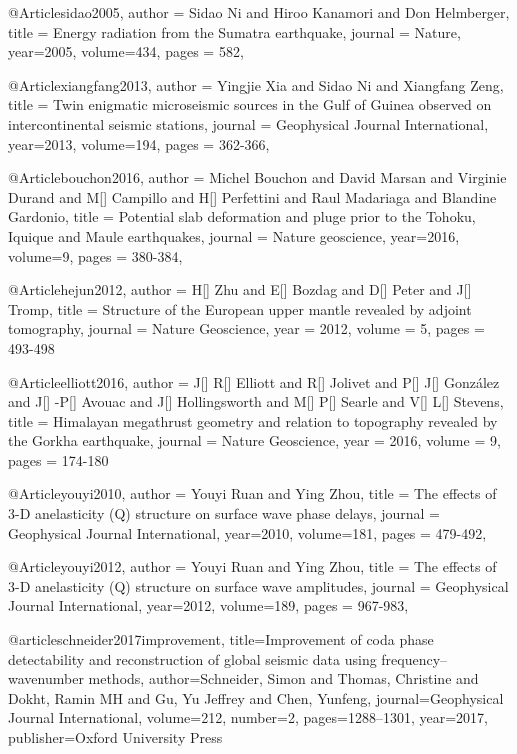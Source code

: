 @Article{sidao2005,
  author =	 {Sidao Ni and Hiroo Kanamori and Don Helmberger},
  title =	 {Energy radiation from the Sumatra earthquake},
  journal =	 {Nature},
  year=2005,
  volume=434,
  pages =	 {582},
}

@Article{xiangfang2013,
  author =	 {Yingjie Xia and Sidao Ni and Xiangfang Zeng},
  title =	 {Twin enigmatic microseismic sources in the Gulf of Guinea observed on intercontinental seismic stations},
  journal =	 {Geophysical Journal International},
  year=2013,
  volume=194,
  pages =	 {362-366},
}

@Article{bouchon2016,
  author =	 {Michel Bouchon and David Marsan and Virginie Durand and M[] Campillo and H[] Perfettini and Raul Madariaga and Blandine Gardonio},
  title =	 {Potential slab deformation and pluge prior to the {T}ohoku, {I}quique and {M}aule earthquakes},
  journal =	 {Nature geoscience},
  year=2016,
  volume=9,
  pages =	 {380-384},
}

@Article{hejun2012,
  author = 	 {H[] Zhu and E[] Bozdag and D[] Peter and J[] Tromp},
  title = 	 {Structure of the European upper mantle revealed by adjoint tomography},
  journal = 	 {Nature Geoscience},
  year = 	 2012,
  volume = 5,
  pages =	 {493-498}
}

@Article{elliott2016,
  author = 	 {J[] R[] Elliott and R[] Jolivet and P[] J[] Gonz\'{a}lez and J[] -P[] Avouac and J[] Hollingsworth and M[] P[] Searle and V[] L[] Stevens},
  title = 	 {Himalayan megathrust geometry and relation to topography revealed by the {G}orkha earthquake},
  journal = 	 {Nature Geoscience},
  year = 	 2016,
  volume = 9,
  pages =	 {174-180}
}

@Article{youyi2010,
  author =	 {Youyi Ruan and Ying Zhou},
  title =	 {The effects of 3-D anelasticity (Q) structure on surface wave phase delays},
  journal =	 {Geophysical Journal International},
  year=2010,
  volume=181,
  pages =	 {479-492},
}

@Article{youyi2012,
  author =	 {Youyi Ruan and Ying Zhou},
  title =	 {The effects of 3-D anelasticity (Q) structure on surface wave amplitudes},
  journal =	 {Geophysical Journal International},
  year=2012,
  volume=189,
  pages =	 {967-983},
}

@article{schneider2017improvement,
  title={Improvement of coda phase detectability and reconstruction of global seismic data using frequency--wavenumber methods},
  author={Schneider, Simon and Thomas, Christine and Dokht, Ramin MH and Gu, Yu Jeffrey and Chen, Yunfeng},
  journal={Geophysical Journal International},
  volume={212},
  number={2},
  pages={1288--1301},
  year={2017},
  publisher={Oxford University Press}
}

